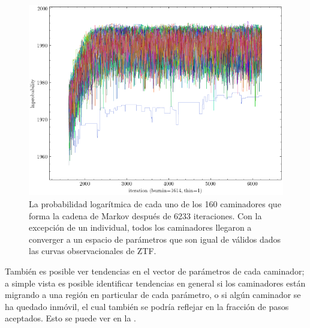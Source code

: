 \begin{figure}[!ht]
	\centering
	\includegraphics[scale=0.56]{Metodologia/Secciones/ModeloComputacional/Figures/Figura Caminadores Trazo lnprobability.png}
	\caption{La probabilidad logarítmica de cada uno de los 160 caminadores que
	forma la cadena de Markov después de 6233 iteraciones. Con la excepción de
	un individual, todos los caminadores llegaron a converger a un espacio de
	parámetros que son igual de válidos dados las curvas observacionales de
	ZTF.}
	\label{figuraCaminadoresTrazoLnprobability}
\end{figure}

También es posible ver tendencias en el vector de parámetros de cada caminador;
a simple vista es posible identificar tendencias en general si los caminadores
están migrando a una región en particular de cada parámetro, o si algún
caminador se ha quedado inmóvil, el cual también se podría reflejar en la
fracción de pasos aceptados. Esto se puede ver en la
.

